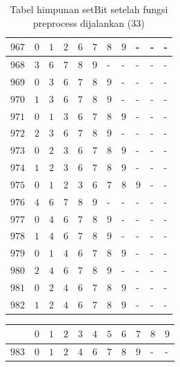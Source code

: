 \begin{appendices}
\begin{table}[H]
\begin{tabular} {|l|l|l|l|l|l|l|l|l|l|l|}
  		$ 967 $ & $ 0 $ &$ 1 $ &$ 2 $ &$ 6 $ &$ 7 $ &$ 8 $ &$ 9 $ & - &  - &  -   \\ \hline
  		$ 968 $ & $ 3 $ &$ 6 $ &$ 7 $ &$ 8 $ &$ 9 $ & - &  - &  - &  - &  -   \\ \hline
  		$ 969 $ & $ 0 $ &$ 3 $ &$ 6 $ &$ 7 $ &$ 8 $ &$ 9 $ & - &  - &  - &  -   \\ \hline
  		$ 970 $ & $ 1 $ &$ 3 $ &$ 6 $ &$ 7 $ &$ 8 $ &$ 9 $ & - &  - &  - &  -   \\ \hline
  		$ 971 $ & $ 0 $ &$ 1 $ &$ 3 $ &$ 6 $ &$ 7 $ &$ 8 $ &$ 9 $ & - &  - &  -   \\ \hline
  		$ 972 $ & $ 2 $ &$ 3 $ &$ 6 $ &$ 7 $ &$ 8 $ &$ 9 $ & - &  - &  - &  -   \\ \hline
  		$ 973 $ & $ 0 $ &$ 2 $ &$ 3 $ &$ 6 $ &$ 7 $ &$ 8 $ &$ 9 $ & - &  - &  -   \\ \hline
  		$ 974 $ & $ 1 $ &$ 2 $ &$ 3 $ &$ 6 $ &$ 7 $ &$ 8 $ &$ 9 $ & - &  - &  -   \\ \hline
  		$ 975 $ & $ 0 $ &$ 1 $ &$ 2 $ &$ 3 $ &$ 6 $ &$ 7 $ &$ 8 $ &$ 9 $ & - &  -   \\ \hline
  		$ 976 $ & $ 4 $ &$ 6 $ &$ 7 $ &$ 8 $ &$ 9 $ & - &  - &  - &  - &  -   \\ \hline
  		$ 977 $ & $ 0 $ &$ 4 $ &$ 6 $ &$ 7 $ &$ 8 $ &$ 9 $ & - &  - &  - &  -   \\ \hline
  		$ 978 $ & $ 1 $ &$ 4 $ &$ 6 $ &$ 7 $ &$ 8 $ &$ 9 $ & - &  - &  - &  -   \\ \hline
  		$ 979 $ & $ 0 $ &$ 1 $ &$ 4 $ &$ 6 $ &$ 7 $ &$ 8 $ &$ 9 $ & - &  - &  -   \\ \hline
  		$ 980 $ & $ 2 $ &$ 4 $ &$ 6 $ &$ 7 $ &$ 8 $ &$ 9 $ & - &  - &  - &  -   \\ \hline
  		$ 981 $ & $ 0 $ &$ 2 $ &$ 4 $ &$ 6 $ &$ 7 $ &$ 8 $ &$ 9 $ & - &  - &  -   \\ \hline
  		$ 982 $ & $ 1 $ &$ 2 $ &$ 4 $ &$ 6 $ &$ 7 $ &$ 8 $ &$ 9 $ & - &  - &  -   \\ \hline
  	\end{tabular}\caption{Tabel himpunan setBit setelah fungsi preprocess dijalankan (33)}
  	\label{tab:setbit_33}
  \end{table}
  \begin{table}[H]
  	\centering
  	\begin{tabular} {|l|l|l|l|l|l|l|l|l|l|l|} \hline
  		\backslashbox{$Num$}{$index$} & $ 0 $ & $ 1 $ & $ 2 $ & $ 3 $ & $ 4 $ & $ 5 $ & $ 6 $ & $ 7 $ & $ 8 $ & $ 9 $ \\ \hline
  		$ 983 $ & $ 0 $ &$ 1 $ &$ 2 $ &$ 4 $ &$ 6 $ &$ 7 $ &$ 8 $ &$ 9 $ & - &  -   \\ \hline

\end{tabular}
\end{table}
\end{appendices}
